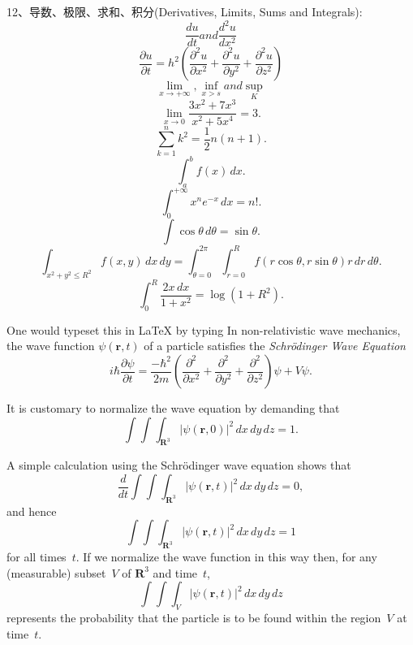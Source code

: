 \documentclass[12pt,a4paper]{article}
\begin{document}
12、导数、极限、求和、积分(Derivatives, Limits, Sums and Integrals):
$$\frac{du}{dt} and \frac{d^2 u}{dx^2}$$
\[ \frac{\partial u}{\partial t}
= h^2 \left( \frac{\partial^2 u}{\partial x^2}
+ \frac{\partial^2 u}{\partial y^2}
+ \frac{\partial^2 u}{\partial z^2}\right)\]
$$\lim_{x \to +\infty}, \inf_{x > s} and \sup_K$$
\[ \lim_{x \to 0} \frac{3x^2 +7x^3}{x^2 +5x^4} = 3.\]
\[ \sum_{k=1}^n k^2 = \frac{1}{2} n (n+1).\]
\[ \int_a^b f(x)\,dx.\]
\[ \int_0^{+\infty} x^n e^{-x} \,dx = n!.\]
\[ \int \cos \theta \,d\theta = \sin \theta.\]
\[ \int_{x^2 + y^2 \leq R^2} f(x,y)\,dx\,dy
= \int_{\theta=0}^{2\pi} \int_{r=0}^R
f(r\cos\theta,r\sin\theta) r\,dr\,d\theta.\]
\[ \int_0^R \frac{2x\,dx}{1+x^2} = \log(1+R^2).\]

One would typeset this in LaTeX by typing In non-relativistic wave mechanics, the wave function
$\psi(\mathbf{r},t)$ of a particle satisfies the
\emph{Schr\"{o}dinger Wave Equation}
\[ i\hbar\frac{\partial \psi}{\partial t}
= \frac{-\hbar^2}{2m} \left(
\frac{\partial^2}{\partial x^2}
+ \frac{\partial^2}{\partial y^2}
+ \frac{\partial^2}{\partial z^2}
\right) \psi + V \psi.\]

It is customary to normalize the wave equation by
demanding that
\[ \int \!\!\! \int \!\!\! \int_{\textbf{R}^3}
\left| \psi(\mathbf{r},0) \right|^2\,dx\,dy\,dz = 1.\]

A simple calculation using the Schr\"{o}dinger wave
equation shows that
\[ \frac{d}{dt} \int \!\!\! \int \!\!\! \int_{\textbf{R}^3}
\left| \psi(\mathbf{r},t) \right|^2\,dx\,dy\,dz = 0,\]
and hence
\[ \int \!\!\! \int \!\!\! \int_{\textbf{R}^3}
\left| \psi(\mathbf{r},t) \right|^2\,dx\,dy\,dz = 1\]
for all times~$t$. If we normalize the wave function in this
way then, for any (measurable) subset~$V$ of $\textbf{R}^3$
and time~$t$,
\[ \int \!\!\! \int \!\!\! \int_V
\left| \psi(\mathbf{r},t) \right|^2\,dx\,dy\,dz\]
represents the probability that the particle is to be found
within the region~$V$ at time~$t$.
\end{document}
